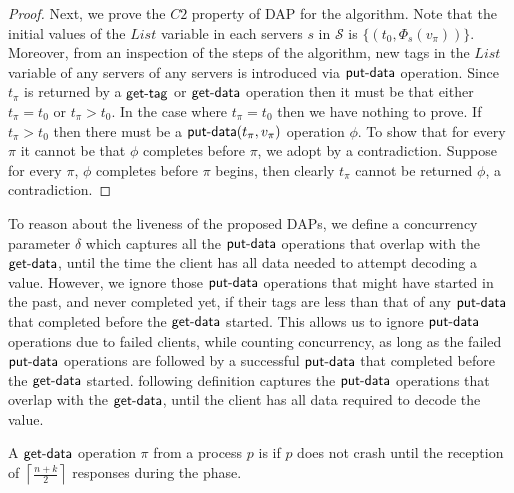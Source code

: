 {\begin{proof}
Next, we prove the $C2$ property of DAP for the \treas{} algorithm. Note that the initial values of the $List$ variable in each servers $s$ in $\mathcal{S}$ is 
$\{ (t_0, \Phi_s(v_{\pi}) )\}$. Moreover, from an inspection of the steps of the algorithm, new tags in the $List$ variable of any servers of any servers is introduced via $\act{put-data}$ operation. Since $t_{\pi}$ is returned by a $\act{get-tag}$ or 
$\act{get-data}$ operation then it must be that either $t_{\pi}=t_0$ or $t_{\pi} > t_0$. In the case where $t_{\pi} = t_0$ then we have nothing to prove. If $t_{\pi} > t_0$ then there must be a $\act{put-data}(t_{\pi}, v_{\pi})$ operation $\phi$. To show that for every $\pi$ it cannot be that $\phi$ completes before $\pi$, we adopt by a contradiction. Suppose for every $\pi$, $\phi$ completes before $\pi$ begins, then clearly $t_{\pi}$ cannot be returned $\phi$, a contradiction.
\end{proof}
}			
	 \label{sec:treas_liveness}
    To reason about the liveness of the proposed DAPs, we define a concurrency parameter $\delta$ which  captures all the  $\act{put-data}$ operations that overlap with the $\act{get-data}$, until the time the client has all data needed to attempt decoding a value. However, we ignore those $\act{put-data}$ operations that might have started in the past, and never completed yet, if their tags are less than that of any $\act{put-data}$ that completed before the  $\act{get-data}$  started. This allows us to ignore $\act{put-data}$ operations due to failed clients, while counting concurrency, as long as the failed $\act{put-data}$ operations are followed by a successful $\act{put-data}$ that completed before the $\act{get-data}$ started. 				
  following definition captures the $\act{put-data}$ operations that overlap with the $\act{get-data}$, until  the client has all data required to  decode the value.
				
\begin{definition}
A $\act{get-data}$  operation $\pi$ from a process $p$ is   if 
$p$ does not crash until the reception of $\left\lceil \frac{n+k}{2} \right\rceil$ responses during the{\GetData} phase. 
\end{definition}
					
